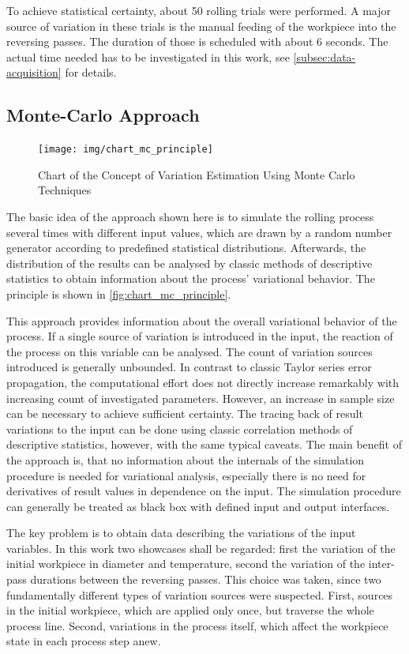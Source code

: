 To achieve statistical certainty, about 50 rolling trials were performed.
A major source of variation in these trials is the manual feeding of the workpiece into the reversing passes.
The duration of those is scheduled with about 6 seconds.
The actual time needed has to be investigated in this work, see \autoref{subsec:data-acquisition} for details.

\subsection{Monte-Carlo Approach}\label{subsec:monte-carlo-approach}

\begin{figure}
    \centering
    \texttt{[image: img/chart\_mc\_principle]}
    \caption{Chart of the Concept of Variation Estimation Using Monte Carlo Techniques}
    \label{fig:chart_mc_principle}
\end{figure}

The basic idea of the approach shown here is to simulate the rolling process several times with different input values, which are drawn by a random number generator according to predefined statistical distributions.
Afterwards, the distribution of the results can be analysed by classic methods of descriptive statistics to obtain information about the process' variational behavior.
The principle is shown in \autoref{fig:chart_mc_principle}.

This approach provides information about the overall variational behavior of the process.
If a single source of variation is introduced in the input, the reaction of the process on this variable can be analysed.
The count of variation sources introduced is generally unbounded.
In contrast to classic Taylor series error propagation, the computational effort does not directly increase remarkably with increasing count of investigated parameters.
However, an increase in sample size can be necessary to achieve sufficient certainty.
The tracing back of result variations to the input can be done using classic correlation methods of descriptive statistics, however, with the same typical caveats.
The main benefit of the approach is, that no information about the internals of the simulation procedure is needed for variational analysis, especially there is no need for derivatives of result values in dependence on the input.
The simulation procedure can generally be treated as black box with defined input and output interfaces.

The key problem is to obtain data describing the variations of the input variables.
In this work two showcases shall be regarded: first the variation of the initial workpiece in diameter and temperature,
second the variation of the inter-pass durations between the reversing passes.
This choice was taken, since two fundamentally different types of variation sources were suspected.
First, sources in the initial workpiece, which are applied only once, but traverse the whole process line.
Second, variations in the process itself, which affect the workpiece state in each process step anew.

